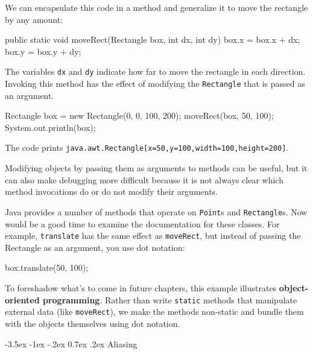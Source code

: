\documentclass[12pt]{book}
\makeatletter
\theoremstyle{exercise}
\newcommand{\java}[1]{\verb"#1"}
\renewcommand{\section}{\@startsection {section}{1}{\z@}%
    {-3.5ex \@plus -1ex \@minus -.2ex}%
    {0.7ex \@plus.2ex}%
    {\normalfont\Large\bfseries}}
\newcommand{\java}[1]{\lstinline{#1}} %
\makeatother
\begin{document}

We can encapsulate this code in a method and generalize it to move the rectangle by any amount:

\begin{code}
    public static void moveRect(Rectangle box, int dx, int dy) {
        box.x = box.x + dx;
        box.y = box.y + dy;
    }
\end{code}

The variables \java{dx} and \java{dy} indicate how far to move the rectangle in each direction.
Invoking this method has the effect of modifying the \java{Rectangle} that is passed as an argument.

\begin{code}
    Rectangle box = new Rectangle(0, 0, 100, 200);
    moveRect(box, 50, 100);
    System.out.println(box);
\end{code}

The code prints \java{java.awt.Rectangle[x=50,y=100,width=100,height=200]}.

Modifying objects by passing them as arguments to methods can be useful, but it can also make debugging more difficult because it is not always clear which method invocations do or do not modify their arguments.

Java provides a number of methods that operate on \java{Point}s and \java{Rectangle}s.
Now would be a good time to examine the documentation for these classes.
For example, \java{translate} has the same effect as \java{moveRect}, but instead of passing the Rectangle as an argument, you use dot notation:

\begin{code}
    box.translate(50, 100);
\end{code}

To foreshadow what's to come in future chapters, this example illustrates {\bf object-oriented programming}.
Rather than write \java{static} methods that manipulate external data (like \java{moveRect}), we make the methods non-static and bundle them with the objects themselves using dot notation.


\section{Aliasing}
\label{aliasing}
\end{document}
